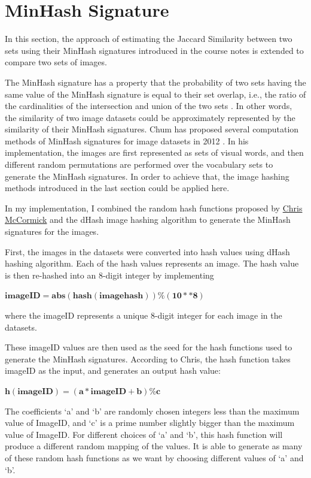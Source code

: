 \documentclass[letterpaper,12pt]{article}
\begin{document}
\section{MinHash Signature}

In this section, the approach of estimating the Jaccard Similarity between two sets using their MinHash signatures introduced in the course notes is extended to compare two sets of images.

The MinHash signature has a property that the probability of two sets having the same value of the MinHash signature is
equal to their set overlap, i.e., the ratio of the cardinalities
of the intersection and union of the two sets  \cite{chum2012fast}. In other words, the similarity of two image datasets could be approximately represented by the similarity of their MinHash signatures. Chum has proposed several computation methods of MinHash signatures for image datasets in 2012 \cite{chum2012fast}. In his implementation, the images are first represented as sets of visual words, and then different random permutations are performed over the vocabulary sets to generate the MinHash signatures. In order to achieve that, the image hashing methods introduced in the last section could be applied here. 

In my implementation, I combined the random hash functions proposed by \href{http://mccormickml.com/2015/06/12/minhash-tutorial-with-python-code/}{Chris McCormick} and the dHash image hashing algorithm to generate the MinHash signatures for the images.  

First, the images in the datasets were converted into hash values using dHash hashing algorithm. Each of the hash values represents an image. The hash value is then re-hashed into an 8-digit integer by implementing 

$\boldsymbol{imageID = abs(hash(imagehash)) \% (10 ** 8) }$

where the imageID represents a unique 8-digit integer for each image in the datasets.

These imageID values are then used as the seed for the hash functions used to generate the MinHash signatures. According to Chris, the hash function takes imageID as the input, and generates an output hash value:

$\boldsymbol{ h(imageID) = (a*imageID+b) \% c }$


The coefficients ‘a’ and ‘b’ are randomly chosen integers less than the maximum value of ImageID, and ‘c’ is a prime number slightly bigger than the maximum value of ImageID. For different choices of ‘a’ and ‘b’, this hash function will produce a different random mapping of the values. It is able to generate as many of these random hash functions as we want by choosing different values of ‘a’ and ‘b’.
\end{document}
